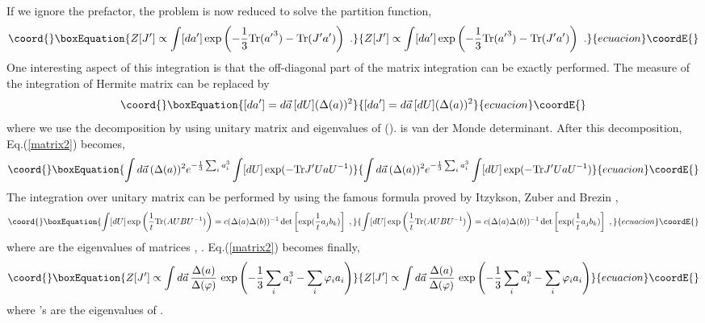 \documentclass[a4paper,aps,preprint,nofootinbib,eqsecnum]{revtex4}
\begin{document}
If we ignore the prefactor, the problem is now reduced to solve the
partition function,
\begin{equation}\coord{}\boxEquation{  \label{matrix2}
Z[J^{\prime}]\propto\int [d{a}^{\prime}] \exp\left( -\frac{1}{3}\mbox{Tr}({{a
}^{\prime}}^3) - \mbox{Tr}( J^{\prime}{a}^{\prime}) \right)\,\,.
}{  Z[J^{\prime}]\propto\int [d{a}^{\prime}] \exp\left( -\frac{1}{3}\mbox{Tr}({{a
}^{\prime}}^3) - \mbox{Tr}( J^{\prime}{a}^{\prime}) \right)\,\,.
}{ecuacion}\coordE{}\end{equation}
One interesting aspect of this integration is that the off-diagonal part of
the matrix integration can be exactly performed. The measure of the
integration of Hermite matrix \coordHE{} can be replaced by
\begin{equation}\coord{}\boxEquation{
[d{a}^{\prime}]=d\vec{a}\, [dU](\Delta(a))^2
}{
[d{a}^{\prime}]=d\vec{a}\, [dU](\Delta(a))^2
}{ecuacion}\coordE{}\end{equation}
where we use the decomposition \coordHE{} by using unitary
matrix \coordHE{} and eigenvalues \coordHE{} of \coordHE{} (\coordHE{}). \coordHE{} is van der Monde determinant. After
this decomposition, Eq.(\ref{matrix2}) becomes,
\begin{equation}\coord{}\boxEquation{
\int d\vec{a}\, (\Delta(a))^2 e^{-\frac{1}{3}\sum_i a_i^3}\int[dU] \exp(-
\mbox{Tr}J^{\prime}UaU^{-1})
}{
\int d\vec{a}\, (\Delta(a))^2 e^{-\frac{1}{3}\sum_i a_i^3}\int[dU] \exp(-
\mbox{Tr}J^{\prime}UaU^{-1})
}{ecuacion}\coordE{}\end{equation}
The integration over unitary matrix can be performed by using the famous
formula proved by Itzykson, Zuber and Brezin \cite{Mehta},
\begin{equation}\coord{}\boxEquation{
\int [dU] \exp\left(\frac{1}{t} \mbox{Tr}(AUBU^{-1})\right) = c
(\Delta(a)\Delta(b))^{-1} \det\left[ \exp(\frac{1}{t}a_jb_k) \right]\,\,,
}{
\int [dU] \exp\left(\frac{1}{t} \mbox{Tr}(AUBU^{-1})\right) = c
(\Delta(a)\Delta(b))^{-1} \det\left[ \exp(\frac{1}{t}a_jb_k) \right]\,\,,
}{ecuacion}\coordE{}\end{equation}
where \coordHE{} are the eigenvalues of matrices \coordHE{}, \coordHE{}. Eq.(\ref{matrix2}) becomes finally,
\begin{equation}\coord{}\boxEquation{
Z[J^{\prime}]\propto \int d\vec{a}\, \frac{\Delta(a)}{\Delta{(\varphi)}} \,
\exp\left( -\frac{1}{3}\sum_{i} a_i^3 -\sum_{i} \varphi_i a_i \right)
}{
Z[J^{\prime}]\propto \int d\vec{a}\, \frac{\Delta(a)}{\Delta{(\varphi)}} \,
\exp\left( -\frac{1}{3}\sum_{i} a_i^3 -\sum_{i} \varphi_i a_i \right)
}{ecuacion}\coordE{}\end{equation}
where \myHighlight{$\varphi$}\coordHE{}'s are the eigenvalues of \coordHE{}.
\end{document}
